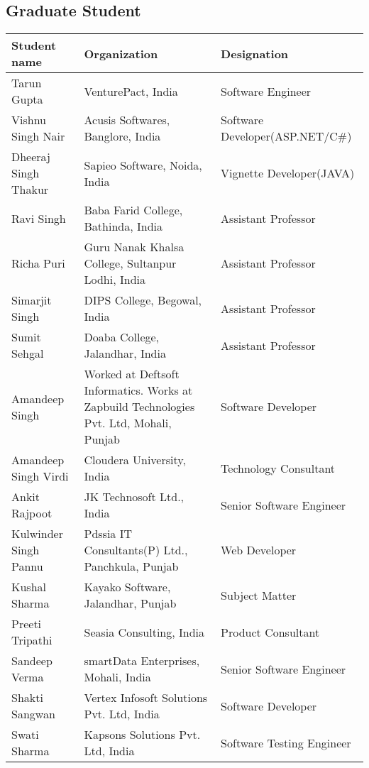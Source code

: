 \documentclass[margin,line]{res}
\begin{document}
\begin{resume}
\newpage

\section{\sc Graduate Student}


\begin{center}
    \begin{tabular}{ | p{3cm} | p{5cm} | l | }
    \hline
    \textbf{Student name} & \textbf{Organization} & \textbf{Designation}\\
    \hline
    Tarun Gupta & VenturePact, India & Software Engineer\\
    \hline
    Vishnu Singh Nair & Acusis Softwares, Banglore, India & Software Developer(ASP.NET/C\#)\\
    \hline
    Dheeraj Singh Thakur & Sapieo Software, Noida, India & Vignette Developer(JAVA)\\
    \hline
    Ravi Singh & Baba Farid College, Bathinda, India & Assistant Professor\\
    \hline
    Richa Puri & Guru Nanak Khalsa College, Sultanpur Lodhi, India & Assistant Professor\\
    \hline
	Simarjit Singh & DIPS College, Begowal, India & Assistant Professor\\
    \hline
    Sumit Sehgal & Doaba College, Jalandhar, India & Assistant Professor\\
    \hline
    Amandeep Singh & Worked at Deftsoft Informatics. Works at Zapbuild Technologies Pvt. Ltd, Mohali, Punjab & Software Developer\\
    \hline
    Amandeep Singh Virdi & Cloudera University, India & Technology Consultant\\
    \hline
    Ankit Rajpoot & JK Technosoft Ltd., India & Senior Software Engineer\\
    \hline
    Kulwinder Singh Pannu & Pdssia IT Consultants(P) Ltd., Panchkula, Punjab & Web Developer\\
    \hline
    Kushal Sharma & Kayako Software, Jalandhar, Punjab & Subject Matter\\
    \hline
    Preeti Tripathi & Seasia Consulting, India & Product Consultant\\
    \hline
    Sandeep Verma & smartData Enterprises, Mohali, India & Senior Software Engineer\\
    \hline
    Shakti Sangwan & Vertex Infosoft Solutions Pvt. Ltd, India & Software Developer\\
    \hline
	Swati Sharma & Kapsons Solutions Pvt. Ltd, India & Software Testing Engineer\\

\end{tabular}
\end{center}
\end{resume}
\end{document}
